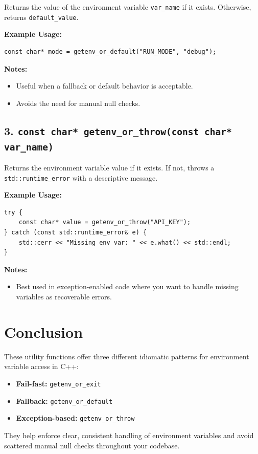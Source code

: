 \documentclass{article}
\begin{document}
Returns the value of the environment variable \lstinline|var_name| if it exists. Otherwise, returns \lstinline|default_value|.

\textbf{Example Usage:}
\begin{lstlisting}
const char* mode = getenv_or_default("RUN_MODE", "debug");
\end{lstlisting}

\textbf{Notes:}
\begin{itemize}
  \item Useful when a fallback or default behavior is acceptable.
  \item Avoids the need for manual null checks.
\end{itemize}

\subsection*{3. \lstinline|const char* getenv_or_throw(const char* var_name)|}

Returns the environment variable value if it exists. If not, throws a \lstinline|std::runtime_error| with a descriptive message.

\textbf{Example Usage:}
\begin{lstlisting}
try {
    const char* value = getenv_or_throw("API_KEY");
} catch (const std::runtime_error& e) {
    std::cerr << "Missing env var: " << e.what() << std::endl;
}
\end{lstlisting}

\textbf{Notes:}
\begin{itemize}
  \item Best used in exception-enabled code where you want to handle missing variables as recoverable errors.
\end{itemize}

\section*{Conclusion}

These utility functions offer three different idiomatic patterns for environment variable access in C++:
\begin{itemize}
  \item \textbf{Fail-fast:} \lstinline|getenv_or_exit|
  \item \textbf{Fallback:} \lstinline|getenv_or_default|
  \item \textbf{Exception-based:} \lstinline|getenv_or_throw|
\end{itemize}

They help enforce clear, consistent handling of environment variables and avoid scattered manual null checks throughout your codebase.
\end{document}
